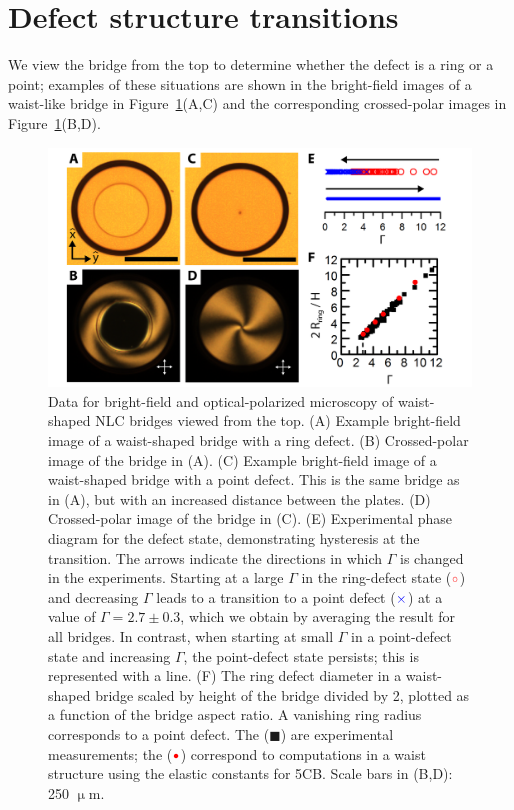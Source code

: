 \section{Defect structure transitions}
We view the bridge from the top to determine whether the defect is a ring or a point; examples of these situations are shown in the bright-field images of a waist-like bridge in Figure~\ref{f:5-ExpWaistTop}(A,C) and the corresponding crossed-polar images in  Figure~\ref{f:5-ExpWaistTop}(B,D).
\begin{figure}
  \centering
  \includegraphics{figures/C5/Ch5-Figs_ExpWaistTop.png}
  \caption{Data for bright-field and optical-polarized microscopy of waist-shaped NLC bridges viewed from the top.
  (A) Example bright-field image of a waist-shaped bridge with a ring defect.
  (B) Crossed-polar image of the bridge in (A).
  (C) Example bright-field image of a waist-shaped bridge with a point defect. This is the same bridge as in (A), but with an increased distance between the plates.
  (D) Crossed-polar image of the bridge in (C).
  (E) Experimental phase diagram for the defect state, demonstrating hysteresis at the transition.
  The arrows indicate the directions in which $\Gamma$ is changed in the experiments.
  Starting at a large $\Gamma$ in the ring-defect state (${\color{red} \circ}$) and decreasing $\Gamma$ leads to a transition to a point defect (${\color{blue} \times}$) at a value of $\Gamma = 2.7 \pm 0.3$, which we obtain by averaging the result for all bridges.
  In contrast, when starting at small $\Gamma$ in a point-defect state and increasing $\Gamma$, the point-defect state persists; this is represented with a line.
  (F) The ring defect diameter in a waist-shaped bridge scaled by height of the bridge divided by 2, plotted as a function of the bridge aspect ratio. A vanishing ring radius corresponds to a point defect.
  The ($\blacksquare$) are experimental measurements; the (${\color{red} \bullet}$) correspond to computations in a waist structure using the elastic constants for 5CB.\@
  Scale bars in (B,D): 250 $\upmu$m.}\label{f:5-ExpWaistTop}
\end{figure}

